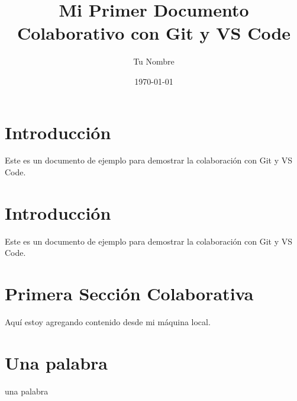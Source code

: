 \documentclass{article}
\title{Mi Primer Documento Colaborativo con Git y VS Code}
\author{Tu Nombre}
\date{\today}
\begin{document}
\maketitle

\section{Introducción}
Este es un documento de ejemplo para demostrar la colaboración con Git y VS Code.

\section{Introducción}
Este es un documento de ejemplo para demostrar la colaboración con Git y VS Code.

\section{Primera Sección Colaborativa}
Aquí estoy agregando contenido desde mi máquina local.

\section{Una palabra}
una palabra
\end{document}
